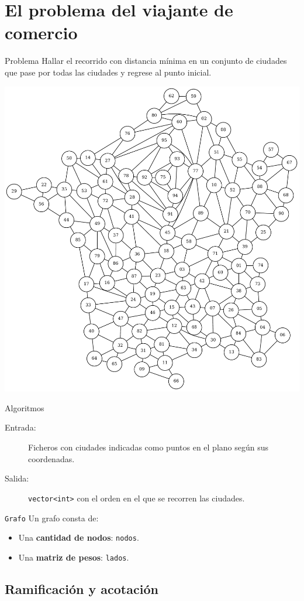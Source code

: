 \section{El problema del viajante de comercio}

\begin{frame}{Problema}
Hallar el recorrido con distancia mínima en un conjunto de
ciudades que pase por todas las ciudades y regrese al punto inicial.

\includegraphics[width=.5\textwidth]{img/Francia} \centering
\end{frame}

\begin{frame}{Algoritmos}
\begin{description}
 \item[Entrada:] Ficheros con ciudades indicadas como puntos en el plano según sus
 coordenadas.
 \item[Salida:] \texttt{vector<int>} con el orden en el que se recorren las ciudades.
\end{description}
\end{frame}


\begin{frame}{\texttt{Grafo}}
Un grafo consta de:

\begin{itemize}
  \item Una \textbf{cantidad de nodos}: \texttt{nodos}.
  \item Una \textbf{matriz de pesos}: \texttt{lados}.
\end{itemize}
\end{frame}

\subsection{Ramificación y acotación}

